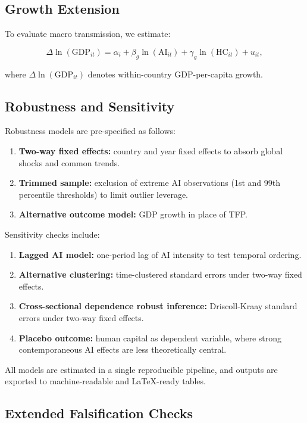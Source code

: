 \subsection{Growth Extension}

To evaluate macro transmission, we estimate:

\[
\Delta \ln(\mathrm{GDP}_{it}) = \alpha_i + \beta_g \ln(\mathrm{AI}_{it}) + \gamma_g \ln(\mathrm{HC}_{it}) + u_{it},
\]

where $\Delta \ln(\mathrm{GDP}_{it})$ denotes within-country GDP-per-capita growth.

\subsection{Robustness and Sensitivity}

Robustness models are pre-specified as follows:

\begin{enumerate}
\item \textbf{Two-way fixed effects:} country and year fixed effects to absorb global shocks and common trends.
\item \textbf{Trimmed sample:} exclusion of extreme AI observations (1st and 99th percentile thresholds) to limit outlier leverage.
\item \textbf{Alternative outcome model:} GDP growth in place of TFP.
\end{enumerate}

Sensitivity checks include:

\begin{enumerate}
\item \textbf{Lagged AI model:} one-period lag of AI intensity to test temporal ordering.
\item \textbf{Alternative clustering:} time-clustered standard errors under two-way fixed effects.
\item \textbf{Cross-sectional dependence robust inference:} Driscoll-Kraay standard errors under two-way fixed effects.
\item \textbf{Placebo outcome:} human capital as dependent variable, where strong contemporaneous AI effects are less theoretically central.
\end{enumerate}

All models are estimated in a single reproducible pipeline, and outputs are exported to machine-readable and LaTeX-ready tables.

\subsection{Extended Falsification Checks}

